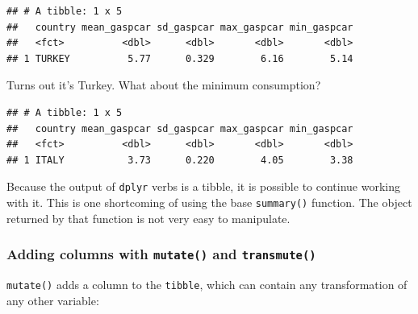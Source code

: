 \documentclass[]{gitbook}
\newenvironment{Shaded}{\begin{snugshade}}{\end{snugshade}}
\newcommand{\KeywordTok}[1]{\textcolor[rgb]{0.13,0.29,0.53}{\textbf{#1}}}
\newcommand{\NormalTok}[1]{#1}
\newcommand{\OperatorTok}[1]{\textcolor[rgb]{0.81,0.36,0.00}{\textbf{#1}}}
\newcommand{\StringTok}[1]{\textcolor[rgb]{0.31,0.60,0.02}{#1}}
\theoremstyle{definition}
\theoremstyle{definition}
\theoremstyle{definition}
\theoremstyle{remark}
\begin{document}
\begin{verbatim}
## # A tibble: 1 x 5
##   country mean_gaspcar sd_gaspcar max_gaspcar min_gaspcar
##   <fct>          <dbl>      <dbl>       <dbl>       <dbl>
## 1 TURKEY          5.77      0.329        6.16        5.14
\end{verbatim}

Turns out it's Turkey. What about the minimum consumption?

\begin{Shaded}
\end{Shaded}

\begin{verbatim}
## # A tibble: 1 x 5
##   country mean_gaspcar sd_gaspcar max_gaspcar min_gaspcar
##   <fct>          <dbl>      <dbl>       <dbl>       <dbl>
## 1 ITALY           3.73      0.220        4.05        3.38
\end{verbatim}

Because the output of \texttt{dplyr} verbs is a tibble, it is possible
to continue working with it. This is one shortcoming of using the base
\texttt{summary()} function. The object returned by that function is not
very easy to manipulate.

\hypertarget{adding-columns-with-mutate-and-transmute}{%
\subsubsection{\texorpdfstring{Adding columns with \texttt{mutate()} and
\texttt{transmute()}}{Adding columns with mutate() and transmute()}}\label{adding-columns-with-mutate-and-transmute}}

\texttt{mutate()} adds a column to the \texttt{tibble}, which can
contain any transformation of any other variable:

\begin{Shaded}
\end{Shaded}
\end{document}
